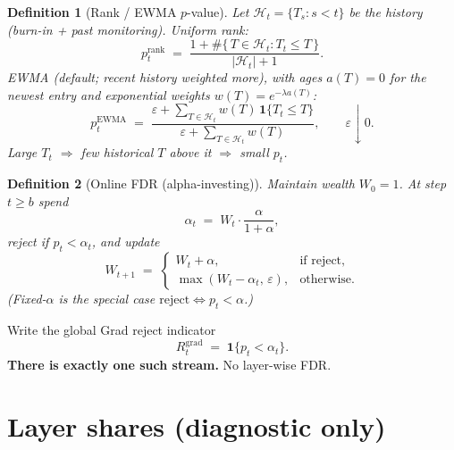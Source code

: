 \documentclass[11pt]{article}
\newtheorem{definition}{Definition}
\begin{document}
\begin{definition}[Rank / EWMA $p$-value]
Let $\mathcal{H}_{t}=\{T_s:s<t\}$ be the history (burn-in + past
monitoring). Uniform rank:
\begin{equation}
\label{eq:prank}
  p_t^{\mathrm{rank}}
  \;=\;
  \frac{1 + \#\{\, T\in\mathcal{H}_{t}: T_t \le T \,\}}
       {|\mathcal{H}_{t}| + 1}.
\end{equation}
EWMA (default; recent history weighted more), with ages
$a(T)=0$ for the newest entry and exponential weights
$w(T)=e^{-\lambda a(T)}$:
\begin{equation}
\label{eq:pewma}
  p_t^{\mathrm{EWMA}}
  \;=\;
  \frac{\varepsilon + \sum_{T\in\mathcal{H}_{t}} w(T)\,
        \mathbf{1}\{T_t \le T\}}
       {\varepsilon + \sum_{T\in\mathcal{H}_{t}} w(T)},
  \qquad \varepsilon\downarrow 0.
\end{equation}
Large $T_t$ $\Rightarrow$ few historical $T$ above it $\Rightarrow$ small $p_t$.
\end{definition}

\begin{definition}[Online FDR (alpha-investing)]
Maintain wealth $W_0=1$. At step $t\ge b$ spend
\begin{equation}
\label{eq:alphat}
  \alpha_t
  \;=\;
  W_t \cdot \frac{\alpha}{1+\alpha},
\end{equation}
reject if $p_t < \alpha_t$, and update
\begin{equation}
\label{eq:wealth}
  W_{t+1}
  \;=\;
  \begin{cases}
    W_t + \alpha, & \text{if reject},\\[0.25em]
    \max(W_t - \alpha_t,\,\varepsilon), & \text{otherwise}.
  \end{cases}
\end{equation}
(Fixed-$\alpha$ is the special case $\mathrm{reject}\iff p_t<\alpha$.)
\end{definition}

Write the global Grad reject indicator
\begin{equation}
\label{eq:Rt}
  R_t^{\mathrm{grad}}
  \;=\;
  \mathbf{1}\{ p_t < \alpha_t \}.
\end{equation}
\textbf{There is exactly one such stream.} No layer-wise FDR.

\section{Layer shares (diagnostic only)}
\label{sec:shares}
\end{document}
